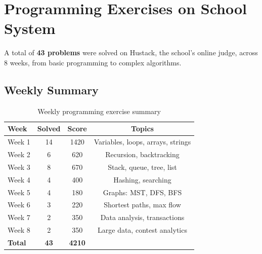 \documentclass[12pt,a4paper]{article}
\begin{document}
\section{Programming Exercises on School System}

A total of \textbf{43 problems} were solved on Hustack, the school's online judge, across 8 weeks, from basic programming to complex algorithms.

\subsection{Weekly Summary}

\begin{table}[H]
\centering\small
\caption{Weekly programming exercise summary}
\label{tab:exercises}
\begin{tabular}{lccc}
\toprule
\textbf{Week} & \textbf{Solved} & \textbf{Score} & \textbf{Topics} \\
\midrule
Week 1 & 14 & 1420 & Variables, loops, arrays, strings \\
Week 2 & 6 & 620 & Recursion, backtracking \\
Week 3 & 8 & 670 & Stack, queue, tree, list \\
Week 4 & 4 & 400 & Hashing, searching \\
Week 5 & 4 & 180 & Graphs: MST, DFS, BFS \\
Week 6 & 3 & 220 & Shortest paths, max flow \\
Week 7 & 2 & 350 & Data analysis, transactions \\
Week 8 & 2 & 350 & Large data, contest analytics \\
\midrule
\textbf{Total} & \textbf{43} & \textbf{4210} & \\
\bottomrule
\end{tabular}
\end{table}



{}
\end{document}
